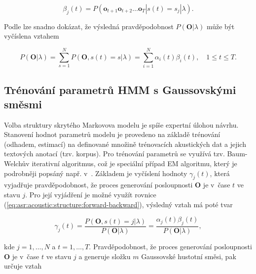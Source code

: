 \begin{equation}
  \beta_j\left(t\right) = P\left(\boldsymbol{o}_{t+1}\boldsymbol{o}_{t+2}\dots \boldsymbol{o}_T|s\left(t\right)=s_j|\lambda\right).
  \label{eq:asr:acoustic:structure:backward}
\end{equation}

\noindent Podle \cite{Psutka2006} lze snadno dokázat, že výsledná pravděpodobnost $P\left(\boldsymbol{O}|\lambda\right)$ může být vyčíslena vztahem

\begin{equation}
  P\left(\boldsymbol{O}|\lambda\right) = \sum_{s=1}^{N} P\left(\boldsymbol{O}, s\left(t\right) = s | \lambda\right) = \sum_{i = 1}^{N} \alpha_{i}\left(t\right)\beta_{i}\left(t\right), \quad 1 \leq t \leq T.
  \label{eq:asr:acoustic:structure:forward-backward}
\end{equation}


\subsection{Trénování parametrů HMM s Gaussovskými směsmi}
\label{chap:asr:acoustic:GMM}

Volba struktury skrytého Markovova modelu je spíše expertní úlohou návrhu. Stanovení hodnot parametrů modelu je provedeno na základě trénování (odhadem, estimací) na definované množině trénovacích akustických dat a jejich textových anotací (tzv. korpus). Pro trénování parametrů se využívá tzv. Baum-Welchův iterativní algoritmus, což je speciální případ EM algoritmu, který je podrobněji popsáný např. v~\cite{Holmes2001}. Základem je vyčíslení hodnoty $\gamma_{j}\left(t\right)$, která vyjadřuje pravděpodobnost, že proces generování posloupnosti $\boldsymbol{O}$ je v~čase $t$ ve stavu $j$. Pro její vyjádření je možné využít rovnice (\ref{eq:asr:acoustic:structure:forward-backward}), výsledný vztah má poté tvar

\begin{equation}
  \gamma_{j}\left(t\right) = \frac{P\left(\boldsymbol{O}, s\left(t\right)=j|\lambda\right)}{P\left(\boldsymbol{O}|\lambda\right)} = \frac{\alpha_{j}\left(t\right)\beta_{j}\left(t\right)}{P\left(\boldsymbol{O}|\lambda\right)} ,
   \label{eq:asr:acoustic:structure:gamma}
\end{equation}

\noindent kde $j = 1,\dots,N$ a $t = 1, \dots, T$. Pravděpodobnost, že proces generování posloupnosti $\boldsymbol{O}$ je v~čase $t$ ve stavu $j$ a generuje složku $m$ Gaussovské hustotní směsi, pak určuje vztah

